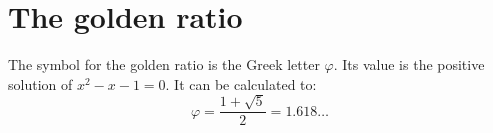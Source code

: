 \documentclass{article}
\begin{document}
\section*{The golden ratio}
The symbol for the golden ratio is the Greek
letter \( \varphi \). Its value is the positive solution
of \( x^2 - x - 1 = 0 \).
It can be calculated to:
\[
  \varphi = \frac{1 + \sqrt{5}}{2} = 1.618 \ldots
\]   
\end{document}
